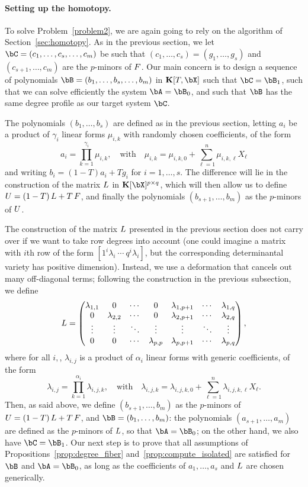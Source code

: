 \documentclass[12pt]{article}
\begin{document}
\paragraph{Setting up the homotopy.}
To solve Problem~\ref{problem2}, we are again going to rely on the
algorithm of Section~\ref{sec:homotopy}. As in the previous section,
we let $\bC=(c_1,\dots,c_s,\dots,c_m)$ be such that
$(c_1,\dots,c_s)=(g_1,\dots,g_s)$ and $(c_{s+1},\dots,c_m)$ are the
$p$-minors of ${F}$. Our main concern is to design a sequence of
polynomials $\bB=(b_1,\dots,b_s,\dots,b_m)$ in $\KK[T,\bX]$ such that
$\bC=\bB_1$, such that we can solve efficiently the system
$\bA=\bB_0$, and such that $\bB$ has the same degree profile as our target system
$\bC$.

The polynomials $(b_1,\dots,b_s)$ are defined as in the previous
section, letting $a_i$ be a product of $\gamma_i$ linear forms
$\mu_{i,k}$ with randomly chosen coefficients, of the form
$$a_i=\prod_{k=1}^{\gamma_i} \mu_{i,k},\quad\text{with}\quad
\mu_{i,k}=\mu_{i,k,0} + \sum_{\ell=1}^n \mu_{i,k,\ell}X_\ell$$ 
and writing $b_i=(1-T)a_i + T g_i$ for $i=1,\dots,s$. The
difference will lie in the construction of the matrix ${L}$ in
$\KK[\bX]^{p\times q}$, which will then allow us to define
${U}=(1-T)\,{L} + T\, {F}$, and finally the polynomials
$(b_{s+1},\dots,b_m)$ as the $p$-minors of ${U}$.

The construction of the matrix ${L}$ presented in the previous section
does not carry over if we want to take row degrees into account (one
could imagine a matrix with $i$th row of the form $[1^i
  \lambda_i~\cdots~q^i \lambda_i]$, but the corresponding determinantal
variety has positive dimension). Instead, we use a deformation that
cancels out many off-diagonal terms; following the 
construction in the previous subsection, we define
\[ {L} = \left( \begin{matrix}
\lambda_{1,1} & 0 & \cdots & 0 & \lambda_{1,p+1} & \cdots & \lambda_{1, q}\\
0 & \lambda_{2,2} & \cdots & 0 & \lambda_{2,p+1} & \cdots & \lambda_{2, q}\\
\vdots & \vdots & \ddots & \vdots & \vdots & \ddots & \vdots\\
0 & 0 & \cdots & \lambda_{p,p} & \lambda_{p,p+1} & \cdots & \lambda_{p, q}
\end{matrix} \right), \] 
where for all $i,$, $\lambda_{i,j}$ is a product of $\alpha_i$ linear forms with generic
coefficients, of the form
$$\lambda_{i,j}= \prod_{k=1}^{\alpha_i}\lambda_{i,j,k},
\quad\text{with}\quad
\lambda_{i,j,k} =\lambda_{i,j,k,0} + \sum_{\ell=1}^n \lambda_{i,j,k,\ell}X_\ell.
$$ Then, as said above, we define $(b_{s+1},\dots,b_m)$ as the
$p$-minors of ${U}=(1-T)\,{L} + T\, {F}$, and $\bB=(b_1,\dots,b_m)$:
the polynomials $(a_{s+1},\dots,a_m)$ are defined as the $p$-minors of
${L}$, so that $\bA=\bB_0$; on the other hand, we also have
$\bC=\bB_1$.  Our next step is to prove that all assumptions of
Propositions~\ref{prop:degree_fiber} and~\ref{prop:compute_isolated}
are satisfied for $\bB$ and $\bA=\bB_0$, as long as the coefficients 
of $a_1,\dots,a_s$ and ${L}$ are chosen generically.
\end{document}
